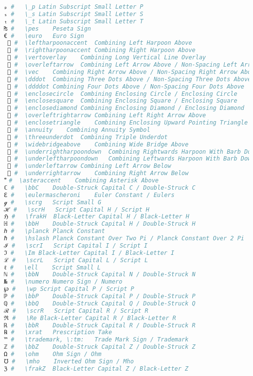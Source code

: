 \begin{lstlisting}[language=Julia, linewidth=\textwidth]
ₚ #   \_p Latin Subscript Small Letter P
ₛ #   \_s Latin Subscript Small Letter S
ₜ #   \_t Latin Subscript Small Letter T
₧ #   \pes    Peseta Sign
€ #   \euro   Euro Sign
 ⃐ #  \leftharpoonaccent  Combining Left Harpoon Above
 ⃑ #  \rightharpoonaccent Combining Right Harpoon Above
 ⃒ #  \vertoverlay    Combining Long Vertical Line Overlay
 ⃖ #  \overleftarrow  Combining Left Arrow Above / Non-Spacing Left Arrow Above
 ⃗ #  \vec    Combining Right Arrow Above / Non-Spacing Right Arrow Above
 ⃛ #  \dddot  Combining Three Dots Above / Non-Spacing Three Dots Above
 ⃜ #  \ddddot Combining Four Dots Above / Non-Spacing Four Dots Above
 ⃝ #  \enclosecircle  Combining Enclosing Circle / Enclosing Circle
 ⃞ #  \enclosesquare  Combining Enclosing Square / Enclosing Square
 ⃟ #  \enclosediamond Combining Enclosing Diamond / Enclosing Diamond
 ⃡ #  \overleftrightarrow Combining Left Right Arrow Above
 ⃤ #  \enclosetriangle    Combining Enclosing Upward Pointing Triangle
 ⃧ #  \annuity    Combining Annuity Symbol
 ⃨ #  \threeunderdot  Combining Triple Underdot
 ⃩ #  \widebridgeabove    Combining Wide Bridge Above
 ⃬ #  \underrightharpoondown  Combining Rightwards Harpoon With Barb Downwards
 ⃭ #  \underleftharpoondown   Combining Leftwards Harpoon With Barb Downwards
 ⃮ #  \underleftarrow Combining Left Arrow Below
 ⃯ #  \underrightarrow    Combining Right Arrow Below
 ⃰ #  \asteraccent    Combining Asterisk Above
ℂ #   \bbC    Double-Struck Capital C / Double-Struck C
ℇ #   \eulermascheroni    Euler Constant / Eulers
ℊ #   \scrg   Script Small G
ℋ #   \scrH   Script Capital H / Script H
ℌ #   \frakH  Black-Letter Capital H / Black-Letter H
ℍ #   \bbH    Double-Struck Capital H / Double-Struck H
ℎ #   \planck Planck Constant
ℏ #   \hslash Planck Constant Over Two Pi / Planck Constant Over 2 Pi
ℐ #   \scrI   Script Capital I / Script I
ℑ #   \Im Black-Letter Capital I / Black-Letter I
ℒ #   \scrL   Script Capital L / Script L
ℓ #   \ell    Script Small L
ℕ #   \bbN    Double-Struck Capital N / Double-Struck N
№ #   \numero Numero Sign / Numero
℘ #   \wp Script Capital P / Script P
ℙ #   \bbP    Double-Struck Capital P / Double-Struck P
ℚ #   \bbQ    Double-Struck Capital Q / Double-Struck Q
ℛ #   \scrR   Script Capital R / Script R
ℜ #   \Re Black-Letter Capital R / Black-Letter R
ℝ #   \bbR    Double-Struck Capital R / Double-Struck R
℞ #   \xrat   Prescription Take
™ #   \trademark, \:tm:   Trade Mark Sign / Trademark
ℤ #   \bbZ    Double-Struck Capital Z / Double-Struck Z
Ω #   \ohm    Ohm Sign / Ohm
℧ #   \mho    Inverted Ohm Sign / Mho
ℨ #   \frakZ  Black-Letter Capital Z / Black-Letter Z

\end{lstlisting}
